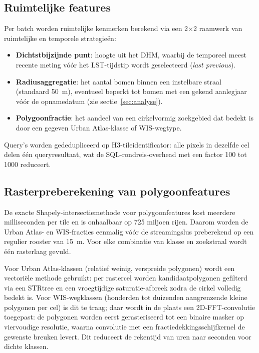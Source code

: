 \subsection{Ruimtelijke features}

Per batch worden ruimtelijke kenmerken berekend via een 2×2 raamwerk van ruimtelijke en temporele strategieën:

\begin{itemize}
  \item \textbf{Dichtstbijzijnde punt}: hoogte uit het DHM, waarbij de temporeel meest recente meting vóór het LST-tijdstip wordt geselecteerd (\textit{last previous}).
  \item \textbf{Radiusaggregatie}: het aantal bomen binnen een instelbare straal (standaard 50~m), eventueel beperkt tot bomen met een gekend aanlegjaar vóór de opnamedatum (zie sectie~\ref{sec:analyse}).
  \item \textbf{Polygoonfractie}: het aandeel van een cirkelvormig zoekgebied dat bedekt is door een gegeven Urban Atlas-klasse of WIS-wegtype.
\end{itemize}

Query's worden gededupliceerd op H3-tileidentificator: alle pixels in dezelfde cel delen één queryresultaat, wat de SQL-rondreis-overhead met een factor 100 tot 1000 reduceert.

\subsection{Rasterpreberekening van polygoonfeatures}

De exacte Shapely-intersectiemethode voor polygoonfeatures kost meerdere milliseconden per tile en is onhaalbaar op 725 miljoen rijen.
Daarom worden de Urban Atlas- en WIS-fracties eenmalig vóór de streamingslus preberekend op een regulier rooster van 15~m.
Voor elke combinatie van klasse en zoekstraal wordt één rasterlaag gevuld.

Voor Urban Atlas-klassen (relatief weinig, verspreide polygonen) wordt een vectoriële methode gebruikt: per rastercel worden kandidaatpolygonen gefilterd via een STRtree en een vroegtijdige saturatie-afbreek zodra de cirkel volledig bedekt is.
Voor WIS-wegklassen (honderden tot duizenden aangrenzende kleine polygonen per cel) is dit te traag; daar wordt in de plaats een 2D-FFT-convolutie toegepast: de polygonen worden eerst gerasteriseerd tot een binaire masker op viervoudige resolutie, waarna convolutie met een fractiedekkingsschijfkernel de gewenste breuken levert.
Dit reduceert de rekentijd van uren naar seconden voor dichte klassen.

